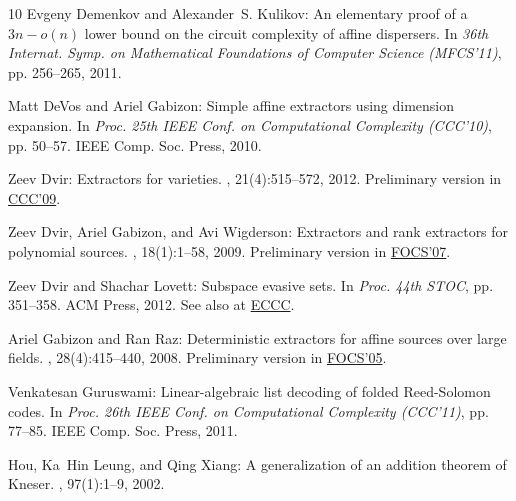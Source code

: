 \begin{thebibliography}{10}
{\sc Evgeny Demenkov and Alexander~S. Kulikov}: An elementary proof of a $3n -
  o(n)$ lower bound on the circuit complexity of affine dispersers.
\newblock In {\em 36th Internat. Symp. on Mathematical Foundations of Computer
  Science (MFCS'11)}, pp. 256--265, 2011.
\newblock [\epfmtdoi{10.1007/978-3-642-22993-0\_25}]

{\sc Matt DeVos and Ariel Gabizon}: Simple affine extractors using dimension
  expansion.
\newblock In {\em Proc. 25th IEEE Conf. on Computational Complexity (CCC'10)},
  pp. 50--57. IEEE Comp. Soc. Press, 2010.

{\sc Zeev Dvir}: Extractors for varieties.
, 21(4):515--572, 2012.
\newblock Preliminary version in
  \href{http://dx.doi.org/10.1109/CCC.2009.7}{CCC'09}.
\newblock [\epfmtdoi{10.1007/s00037-011-0023-3}]

{\sc Zeev Dvir, Ariel Gabizon, and Avi Wigderson}: Extractors and rank
  extractors for polynomial sources.
, 18(1):1--58, 2009.
\newblock Preliminary version in
  \href{http://dx.doi.org/10.1109/FOCS.2007.9}{FOCS'07}.
\newblock [\epfmtdoi{10.1007/s00037-009-0258-4}]

{\sc Zeev Dvir and Shachar Lovett}: Subspace evasive sets.
\newblock In {\em Proc. 44th STOC}, pp. 351--358. ACM Press, 2012.
\newblock See also at \href{http://eccc.hpi-web.de/report/2011/139/}{ECCC}.
\newblock [\epfmtdoi{10.1145/2213977.2214010}]

{\sc Ariel Gabizon and Ran Raz}: Deterministic extractors for affine sources
  over large fields.
, 28(4):415--440, 2008.
\newblock Preliminary version in
  \href{http://dx.doi.org/10.1109/SFCS.2005.31}{FOCS'05}.
\newblock [\epfmtdoi{10.1007/s00493-008-2259-3}]

{\sc Venkatesan Guruswami}: Linear-algebraic list decoding of folded
  {R}eed-{S}olomon codes.
\newblock In {\em Proc. 26th IEEE Conf. on Computational Complexity (CCC'11)},
  pp. 77--85. IEEE Comp. Soc. Press, 2011.

{ Hou, Ka~Hin Leung, and Qing Xiang}: A generalization of an
  addition theorem of {K}neser.
, 97(1):1--9, 2002.


\end{thebibliography}
